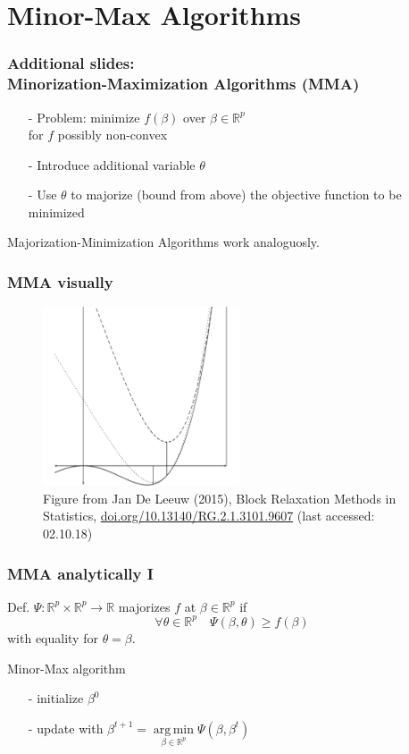\documentclass[handout]{beamer}
\newcommand{\R}{\mathbb{R}}
\DeclareMathOperator*{\argmin}{arg\,min}
\begin{document}
\section*{Minor-Max Algorithms}

\begin{frame}
\frametitle{Additional slides: \\ Minorization-Maximization Algorithms (MMA)}
\begin{itemize}
\item[-] Problem: minimize $f(\beta)$ over $\beta\in\R^p$\\ for $f$ possibly non-convex
\item[-] Introduce additional variable $\theta$
\item[-] Use $\theta$ to majorize (bound from above) the objective function to be minimized
\end{itemize}


{\small Majorization-Minimization Algorithms work analoguosly.}
\end{frame}

\begin{frame}
\frametitle{MMA visually}
\begin{figure}
\includegraphics[height=150pt]{img/minmaxalgo2.png}
\caption{Figure from Jan De Leeuw (2015), Block Relaxation Methods in Statistics, \url{doi.org/10.13140/RG.2.1.3101.9607} (last accessed: 02.10.18)}
\end{figure}

\end{frame}

\begin{frame}
\frametitle{MMA analytically I}
Def. 
$\Psi:\R^p\times\R^p\to\R$ {\color{blue}majorizes} $f$ at $\beta\in\R^p$ if \[\forall\theta\in\R^p\quad \Psi(\beta,\theta)\ge f(\beta)\]
with equality for $\theta=\beta$.
\vspace{10pt}

Minor-Max algorithm
\begin{itemize}
\item[-] initialize $\beta^0$
\item[-] update with $\beta^{t+1}=\argmin\limits_{\beta\in\R^p}\Psi(\beta,\beta^t)$
\end{itemize}
\end{frame}
\end{document}
